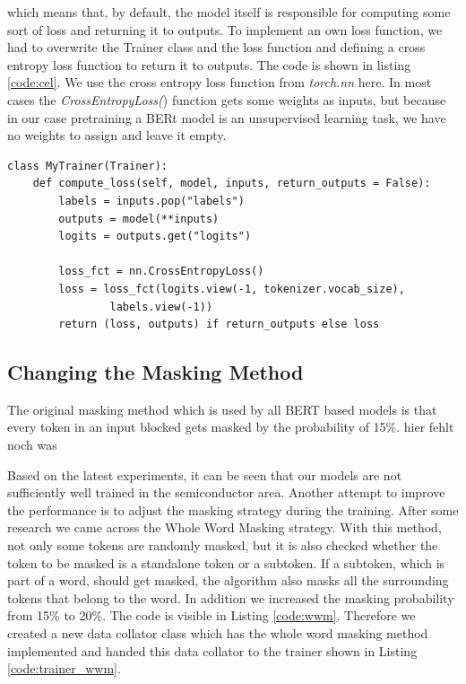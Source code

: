 which means that, by default, the model itself is responsible for computing some sort of loss and returning it to outputs. To implement an own loss function, we had to overwrite the Trainer class and the loss function and defining a cross entropy loss function to return it to outputs. The code is shown in listing \ref{code:cel}. We use the cross entropy loss function from \textit{torch.nn} here. In most cases the \textit{CrossEntropyLoss(}) function gets some weights as inputs, but because in our case pretraining a BERt model is an unsupervised learning task, we have no weights to assign and leave it empty.

\begin{code}
	\label{code:cel}
\begin{verbatim}
class MyTrainer(Trainer):
	def compute_loss(self, model, inputs, return_outputs = False):
		labels = inputs.pop("labels")
		outputs = model(**inputs)
		logits = outputs.get("logits")

		loss_fct = nn.CrossEntropyLoss()
		loss = loss_fct(logits.view(-1, tokenizer.vocab_size),
				labels.view(-1))
		return (loss, outputs) if return_outputs else loss
\end{verbatim}
\end{code}

\subsection{Changing the Masking Method}
The original masking method which is used by all BERT based models is that every token in an input blocked gets masked by the probability of 15\%. 
\alert{hier fehlt noch was}

Based on the latest experiments, it can be seen that our models are not sufficiently well trained in the semiconductor area. Another attempt to improve the performance is to adjust the masking strategy during the training. After some research we came across the Whole Word Masking strategy. With this method, not only some tokens are randomly masked, but it is also checked whether the token to be masked is a standalone token or a subtoken. If a subtoken, which is part of a word, should get masked, the algorithm also masks all the surrounding tokens that belong to the word. In addition we increased the masking probability from 15\% to 20\%. The code is visible in Listing \ref{code:wwm}. Therefore we created a new data collator class \alert{which has the whole word masking method implemented} and handed this data collator to the trainer shown in Listing \ref{code:trainer_wwm}.

